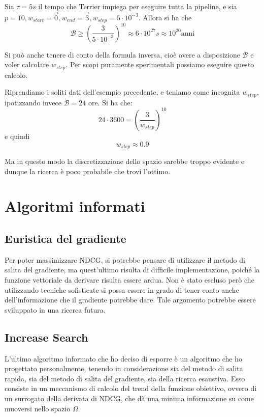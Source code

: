 \begin{esempio}\label{ex:gsspace}
	Sia $\tau = 5s$ il tempo che Terrier impiega per eseguire tutta la pipeline, e sia $p=10, w_{start} = \vec{0}, w_{end} = \vec{3}, w_{step} = 5 \cdot 10^{-3}$.
	Allora si ha che
	$$
	\mathcal{B} \geq \left(\frac{3}{5 \cdot 10^{-3}}\right)^{10} \approx 6 \cdot 10^{27}s \approx 10^{20} \text{anni}
	$$
\end{esempio}


\begin{esempio}
	Si può anche tenere di conto della formula inversa, cioè avere a disposizione $\mathcal{B}$ e voler
	calcolare $w_{step}$. Per scopi puramente sperimentali possiamo eseguire questo calcolo.
	
	Riprendiamo i soliti dati dell'esempio precedente, e teniamo come incognita $w_{step}$, ipotizzando
	invece $\mathcal{B} = 24$ ore.
	Si ha che:
	$$
	24 \cdot 3600 = \left(\frac{3}{w_{step}}\right)^{10}
	$$
	e quindi
	$$
	w_{step} \approx 0.9
	$$
	
	Ma in questo modo la discretizzazione dello spazio sarebbe troppo evidente e dunque la ricerca è poco
	probabile che trovi l'ottimo.
\end{esempio}

\section{Algoritmi informati}

\subsection{Euristica del gradiente}
Per poter massimizzare NDCG, si potrebbe pensare di utilizzare il metodo di salita del gradiente,
ma quest'ultimo risulta di difficile implementazione, poiché la funzione vettoriale
da derivare risulta essere ardua. Non è stato escluso però che utilizzando tecniche
sofisticate si possa essere in grado di tener conto anche dell'informazione
che il gradiente potrebbe dare.
Tale argomento potrebbe essere sviluppato in una ricerca futura.

\subsection{Increase Search}
L'ultimo algoritmo informato che ho deciso di esporre è un algoritmo che ho
progettato personalmente, tenendo in considerazione sia del metodo di salita rapida,
sia del metodo di salita del gradiente,
sia della ricerca esaustiva. Esso consiste in un meccanismo di calcolo del trend della funzione obiettivo,
ovvero di un surrogato della derivata di NDCG, che dà una minima informazione su come
muoversi nello spazio $\Omega$.

